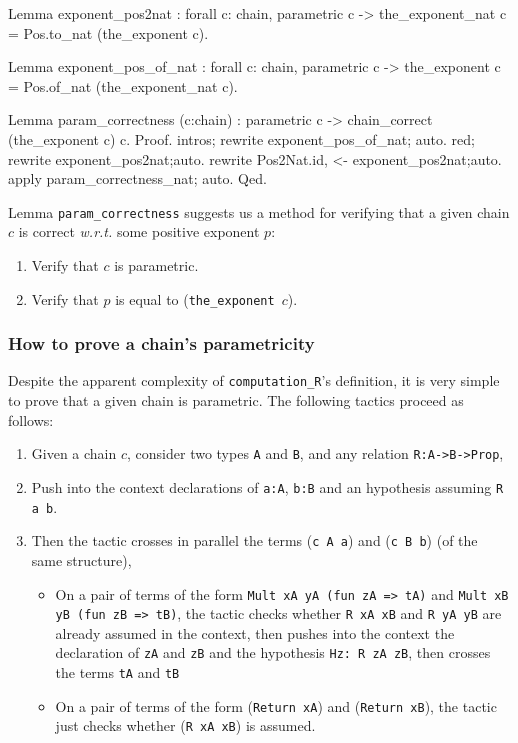 \begin{Coqsrc}
Lemma exponent_pos2nat : forall c: chain,  parametric c -> 
  the_exponent_nat c = Pos.to_nat (the_exponent c).

Lemma exponent_pos_of_nat : forall c: chain,  parametric c -> 
  the_exponent c = Pos.of_nat (the_exponent_nat c).

Lemma param_correctness (c:chain) :
   parametric c -> 
   chain_correct (the_exponent c) c. 
Proof.
  intros; rewrite  exponent_pos_of_nat; auto.
  red;  rewrite  exponent_pos2nat;auto.
  rewrite Pos2Nat.id,  <- exponent_pos2nat;auto.
  apply param_correctness_nat; auto.
Qed.
\end{Coqsrc}

Lemma \texttt{param\_correctness} suggests us a method for verifying 
that a given chain $c$ is correct \emph{w.r.t.} some positive exponent $p$:

\begin{enumerate}
\item Verify that $c$ is parametric.
\item Verify that $p$ is equal to (\texttt{the\_exponent $c$}).
\end{enumerate}

\subsubsection{How to prove a chain's parametricity}
Despite the apparent complexity of \texttt{computation\_R}'s definition,
it is very simple to prove that a given chain is parametric. The following tactics
proceed as follows:

\begin{enumerate}
\item Given a chain $c$, consider two types \texttt{A} and
\texttt{B}, and any relation \texttt{R:A->B->Prop}, 
\item Push into the context declarations of \texttt{a:A}, \texttt{b:B}
and an hypothesis assuming \texttt{R a b}.
\item Then the tactic crosses in parallel the terms (\texttt{c A a}) and
(\texttt{c B b}) (of the same structure),
\begin{itemize}
\item On a pair of terms of the form 
\texttt{Mult xA yA (fun zA => tA)} and \linebreak \texttt{Mult xB yB (fun zB => tB)}, the tactic checks whether 
   \texttt{R xA xB} and \texttt{R yA yB} are already assumed in the context,
 then  pushes into the context the declaration of \texttt{zA} and \texttt{zB}
and the hypothesis \linebreak \texttt{Hz: R zA zB}, then crosses the terms \texttt{tA} and
 \texttt{tB}
\item On a pair of terms  of the form   (\texttt{Return xA}) and (\texttt{Return xB}),
 the tactic just checks whether (\texttt{R xA xB}) is assumed.
\end{itemize}

\end{enumerate}

